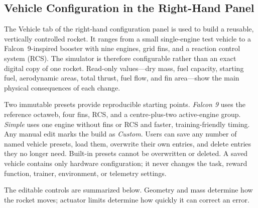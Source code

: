 \subsection{Vehicle Configuration in the Right-Hand Panel}
\label{subsec:vehicle-configuration-panel}

The Vehicle tab of the right-hand configuration panel is used to build a reusable, vertically controlled rocket. It ranges from a small single-engine test vehicle to a Falcon~9-inspired booster with nine engines, grid fins, and a reaction control system (RCS). The simulator is therefore configurable rather than an exact digital copy of one rocket. Read-only values---dry mass, fuel capacity, starting fuel, aerodynamic areas, total thrust, fuel flow, and fin area---show the main physical consequences of each change.

Two immutable presets provide reproducible starting points. \emph{Falcon 9} uses the reference octaweb, four fins, RCS, and a centre-plus-two active-engine group. \emph{Simple} uses one engine without fins or RCS and faster, training-friendly timing. Any manual edit marks the build as \emph{Custom}. Users can save any number of named vehicle presets, load them, overwrite their own entries, and delete entries they no longer need. Built-in presets cannot be overwritten or deleted. A saved vehicle contains only hardware configuration; it never changes the task, reward function, trainer, environment, or telemetry settings.

The editable controls are summarized below. Geometry and mass determine how the rocket moves; actuator limits determine how quickly it can correct an error.

